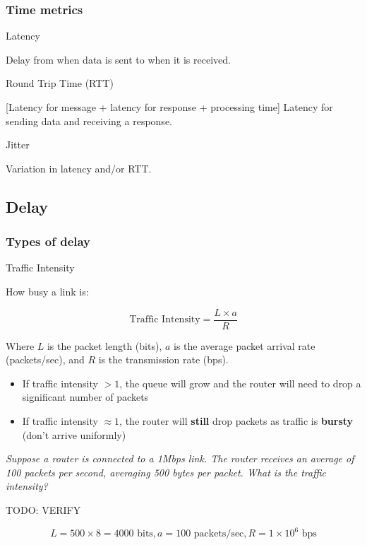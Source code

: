 \subsubsection{Time metrics}

\begin{knBox}
    {Latency}

    Delay from when data is sent to when it is received.
\end{knBox}

\begin{knBox}
    {Round Trip Time (RTT)}

    [Latency for message + latency for response + processing time] Latency for sending data and receiving a response.
\end{knBox}

\begin{knBox}
    {Jitter}

    Variation in latency and/or RTT.
\end{knBox}

\subsection{Delay}

\subsubsection{Types of delay}



\begin{definition}
    {Traffic Intensity}

    How busy a link is:

    \[\text{Traffic Intensity} = \frac{L \times a}{R}\]

    Where $L$ is the packet length (bits), $a$ is the average packet arrival rate (packets/sec), and $R$ is the transmission rate (bps).

    \begin{itemize}
        \item If traffic intensity $> 1$, the queue will grow and the router will need to drop a significant number of packets
        \item If traffic intensity $\approx 1$, the router will \textbf{still} drop packets as traffic is \textbf{bursty} (don't arrive uniformly)
    \end{itemize}

    \tcblower

    \textit{Suppose a router is connected to a 1Mbps link. The router receives an average of
        100 packets per second, averaging 500 bytes per packet. What is the traffic
        intensity?}


    TODO: VERIFY

    \[L = 500 \times 8 = 4000 \text{ bits}, a = 100 \text{ packets/sec}, R = 1 \times 10^6 \text{ bps}\]
\end{definition}

